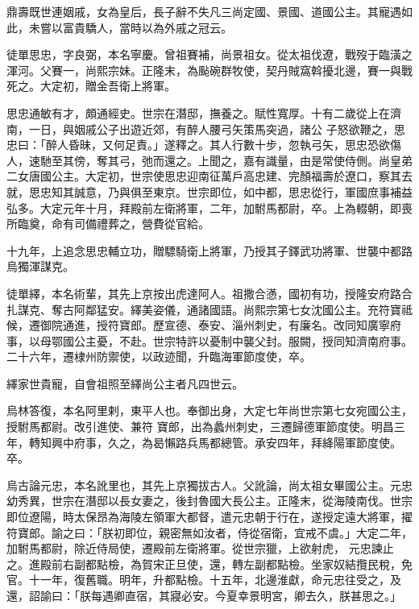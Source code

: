 \begin{pinyinscope}
 鼎壽既世連姻戚，女為皇后，長子辭不失凡三尚定國、景國、道國公主。其寵遇如此，未嘗以富貴驕人，當時以為外戚之冠云。



 徒單思忠，字良弼，本名寧慶。曾祖賽補，尚景祖女。從太祖伐遼，戰歿于臨潢之渾河。父賽一，尚熙宗妹。正隆末，為颭碗群牧使，契丹賊窩斡擾北邊，賽一與戰死之。大定初，贈金吾衛上將軍。



 思忠通敏有才，頗通經史。世宗在潛邸，撫養之。賦性寬厚。十有二歲從上在濟南，一日，與姻戚公子出遊近郊，有醉人腰弓矢策馬突過，諸公
 子怒欲鞭之，思忠曰：「醉人昏昧，又何足責。」遂釋之。其人行數十步，忽執弓矢，思忠恐欲傷人，速馳至其傍，奪其弓，弛而還之。上聞之，嘉有識量，由是常使侍側。尚皇弟二女唐國公主。大定初，世宗使思忠迎南征萬戶高忠建、完顏福壽於遼口，察其去就，思忠知其誠意，乃與俱至東京。世宗即位，如中都，思忠從行，軍國庶事補益弘多。大定元年十月，拜殿前左衛將軍，二年，加駙馬都尉，卒。上為輟朝，即喪所臨奠，命有司備禮葬之，營費從官給。



 十九年，上追念思忠輔立功，贈驃騎衛上將軍，乃授其子鐸武功將軍、世襲中都路烏獨渾謀克。



 徒單繹，本名術輩，其先上京按出虎達阿人。祖撒合懣，國初有功，授隆安府路合扎謀克、奪古阿鄰猛安。繹美姿儀，通諸國語。尚熙宗第七女沈國公主。充符寶祗候，遷御院通進，授符寶郎。歷宣德、泰安、淄州刺史，有廉名。改同知廣寧府事，以母鄂國公主憂，不赴。世宗特許以憂制中襲父封。服闕，授同知濟南府事。二十六年，遷棣州防禦使，以政迹聞，升臨海軍節度使，卒。



 繹家世貴寵，自會祖照至繹尚公主者凡四世云。



 烏林答復，本名阿里剌，東平人也。奉御出身，大定七年尚世宗第七女宛國公主，授駙馬都尉。改引進使、兼符
 寶郎，出為蠡州刺史，三遷歸德軍節度使。明昌三年，轉知興中府事，久之，為曷懶路兵馬都總管。承安四年，拜絳陽軍節度使。卒。



 烏古論元忠，本名訛里也，其先上京獨拔古人。父訛論，尚太祖女畢國公主。元忠幼秀異，世宗在潛邸以長女妻之，後封魯國大長公主。正隆末，從海陵南伐。世宗即位遼陽，時太保昂為海陵左領軍大都督，遣元忠朝于行在，遂授定遠大將軍，擢符寶郎。諭之曰：「朕初即位，親密無如汝者，侍從宿衛，宜戒不虞。」大定二年，加駙馬都尉，除近侍局使，遷殿前左衛將軍。從世宗獵，上欲射虎，
 元忠諫止之。進殿前右副都點檢，為賀宋正旦使，還，轉左副都點檢。坐家奴結攬民稅，免官。十一年，復舊職。明年，升都點檢。十五年，北邊淮獻，命元忠往受之，及還，詔諭曰：「朕每遇卿直宿，其寢必安。今夏幸景明宮，卿去久，朕甚思之。」




\end{pinyinscope}
